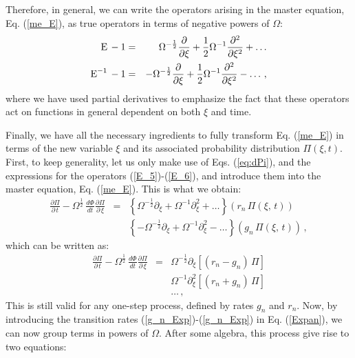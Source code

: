 Therefore, in general, we can write the operators arising in the master equation, Eq. (\ref{me_E}), as true operators in terms of negative powers of $\Omega$:
\begin{eqnarray}
\label{E_5}
\textup{E}\,-1      & = &  \Omega^{-\frac{1}{2}}\frac{\partial}{\partial\xi}+\frac{1}{2}\Omega^{-1}\frac{\partial^2}{\partial\xi^2}+\ldots\\
\textup{E}^{-1}\,-1 & = & -\Omega^{-\frac{1}{2}}\frac{\partial}{\partial\xi}+\frac{1}{2}\Omega^{-1}\frac{\partial^2}{\partial\xi^2}-\ldots\,,
\label{E_6}
\end{eqnarray}
where we have used partial derivatives to emphasize the fact that these operators act on functions in general dependent on both $\xi$ and time. 

Finally, we have all the necessary ingredients to fully transform Eq. (\ref{me_E}) in terms of the new variable $\xi$ and its associated probability distribution $\Pi(\xi,t)$. First, to keep generality, let us only make use of Eqs. (\ref{eq:dPi}), and the expressions for the operators (\ref{E_5})-(\ref{E_6}), and introduce them into the master equation, Eq. (\ref{me_E}). This is what we obtain:
\begin{eqnarray}
\frac{\partial\Pi}{\partial\,t}-\Omega^{\frac{1}{2}}\,\frac{d\Phi}{dt}\frac{\partial\Pi}{\partial\,\xi} & = & \left\{\Omega^{-\frac{1}{2}}\partial_{\xi}+\Omega^{-1}\partial_{\xi}^2+\dots\right\}(r_n\,\Pi(\xi,\,t))\nonumber\\
         &   & \left\{-\Omega^{-\frac{1}{2}}\partial_{\xi}+\Omega^{-1}\partial_{\xi}^2-\dots\right\}(g_n\,\Pi(\xi,\,t))\,,
\end{eqnarray}
which can be written as:
\begin{eqnarray}
\label{Expan}
\frac{\partial\Pi}{\partial\,t}-\Omega^{\frac{1}{2}}\,\frac{d\Phi}{dt}\frac{\partial\Pi}{\partial\,\xi} & = &\Omega^{-\frac{1}{2}}\partial_{\xi}\left[(r_n-g_n)\,\Pi\right]\nonumber\\
         &   &\Omega^{-1}\partial_{\xi}^2\left[(r_n+g_n)\,\Pi\right]\nonumber\\
         &   &\dots\,,
\end{eqnarray}
This is still valid for any one-step process, defined by rates $g_n$ and $r_n$. Now, by introducing the transition rates (\ref{g_n_Exp})-(\ref{g_n_Exp}) in Eq. (\ref{Expan}), we can now group terms in powers of $\Omega$. After some algebra, this process give rise to two equations:

